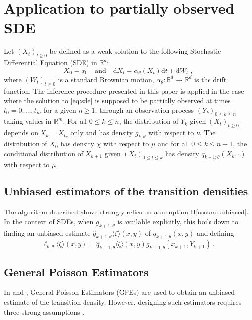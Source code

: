 \documentclass[12pt]{article}
\def\Xset{\mathbb{R}^d}
\newcommand{\md}[1]{g_{#1}}
\newcommand{\parvec}{\theta}
\newcommand{\hd}[1]{q_{#1}}
\newcommand{\hdhat}[1]{\widehat{q}_{#1}}
\newcommand{\rmd}{\ensuremath{\mathrm{d}}}
\newcommand{\eqsp}{\;}
\newcommand{\hatqg}[1]{\mathsf{\ell}_{#1}}
\begin{document}
\section{Application to partially observed SDE}
\label{sec:filter:SDE}
Let $(X_t)_{t\ge 0}$ be defined as a weak solution to the following Stochastic Differential Equation (SDE) in $\mathbb{R}^d$:
\begin{equation}
\label{eq:sde}
X_0 = x_0 \quad\mbox{and}\quad \rmd X_t = \alpha_{\parvec}(X_t)\rmd t + \rmd W_t\eqsp,
\end{equation}
where $(W_t)_{t\geqslant 0}$ is a standard Brownian motion, $\alpha_{\parvec}: \Xset\to\Xset$ is the drift function. 
The inference procedure presented in this paper is applied in the case where the solution to \eqref{eq:sde} is supposed to be partially observed at times $t_0 = 0,\ldots,t_n$, for a given $n\geqslant 1$, through an observation process $(Y_k)_{0\leqslant k \leqslant n}$ taking values in $\mathbb{R}^m$. For all $0\leqslant k \leqslant n$, the distribution of $Y_k$ given $(X_t)_{t\geqslant 0}$ depends on $X_k = X_{t_k}$ only and has density $\md{k;\parvec}$ with respect to $\nu$. The distribution of $X_0$ has density $\chi$ with respect to $\mu$ and for all $0\leqslant k \leqslant n-1$, the conditional distribution of $X_{k+1} $ given $(X_{t})_{0\leqslant t\leqslant k}$ has density $\hd{k+1;\parvec}(X_{k},\cdot)$ with respect to $\mu$. 

\subsection{Unbiased estimators of the transition densities}

The algorithm described above strongly relies on assumption H\ref{assum:unbiased}. 
In the context of SDEs, when $\md{k+1;\parvec}$ is available explicitly, this boils down to finding an unbiased estimate $\hdhat{k+1;\parvec}\langle \zeta\rangle(x,y)$ of $\hd{k+1;\parvec}(x,y)$ and defining
\[
\hatqg{k;\parvec}\langle \zeta\rangle(x,y) = \hdhat{k+1;\parvec}\langle \zeta\rangle(x,y)\md{k+1;\parvec}(x_{k+1},Y_{k+1})\eqsp.
\]

\subsection{General Poisson Estimators}
In \cite{olsson2011particle} and \cite{gloaguen2018online}, General Poisson Estimators (GPEs) are used to obtain an unbiased estimate of the transition density.  However, designing such estimators requires three strong assumptions \citep{beskos2006retrospective}.
\end{document}
